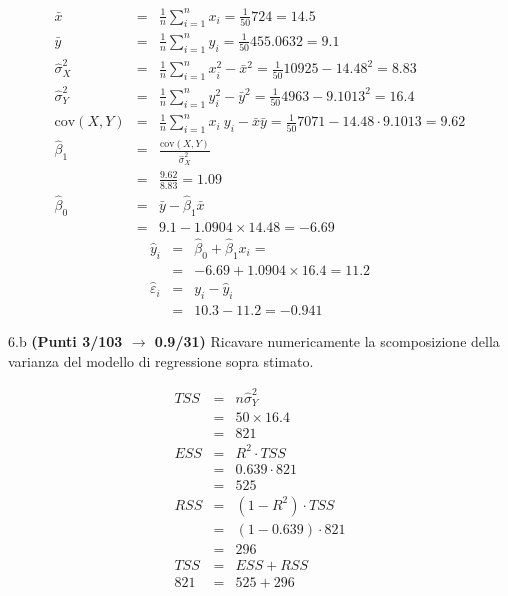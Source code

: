 \documentclass[
  11pt,
]{book}
\theoremstyle{mytheoremstyle}
\theoremstyle{mydefstyle}
\newenvironment{sol}
  {
  \begin{tcolorbox}[enhanced,breakable,arc=0.1mm,boxrule=1pt,colback=white,colframe=iblue,
  title=\bf \fontfamily{lmss}\selectfont \hspace{.5 cm} Soluzione,drop fuzzy shadow]

}{
\end{tcolorbox}
  }
\begin{document}
\begin{sol}
\begin{eqnarray*}
           \bar x &=&\frac 1 n\sum_{i=1}^n x_i = \frac {1}{ 50 }  724 =  14.5 \\
           \bar y &=&\frac 1 n\sum_{i=1}^n y_i = \frac {1}{ 50 }  455.0632 =  9.1 \\
           \hat\sigma_X^2&=&\frac 1 n\sum_{i=1}^n x_i^2-\bar x^2=\frac {1}{ 50 }  10925  - 14.48 ^2= 8.83 \\
           \hat\sigma_Y^2&=&\frac 1 n\sum_{i=1}^n y_i^2-\bar y^2=\frac {1}{ 50 }  4963  - 9.1013 ^2= 16.4 \\
           \text{cov}(X,Y)&=&\frac 1 n\sum_{i=1}^n x_i~y_i-\bar x\bar y=\frac {1}{ 50 }  7071 - 14.48 \cdot 9.1013 = 9.62 \\
           \hat\beta_1 &=& \frac{\text{cov}(X,Y)}{\hat\sigma_X^2} \\
                    &=& \frac{ 9.62 }{ 8.83 }  =  1.09 \\
           \hat\beta_0 &=& \bar y - \hat\beta_1 \bar x\\
                    &=&  9.1 - 1.0904 \times  14.48 = -6.69 
         \end{eqnarray*}\begin{eqnarray*}
\hat y_i &=&\hat\beta_0+\hat\beta_1 x_i=\\ 
&=& -6.69 + 1.0904 \times 16.4 = 11.2 \\ 
\hat \varepsilon_i &=& y_i-\hat y_i\\ 
&=& 10.3 - 11.2 = -0.941  
\end{eqnarray*}

\end{sol}

6.b \textbf{(Punti 3/103 \(\rightarrow\) 0.9/31)} Ricavare numericamente la scomposizione della varianza del modello di regressione sopra stimato.

\begin{sol}
\begin{eqnarray*}
   TSS &=& n\hat\sigma^2_Y\\
      &=& 50 \times 16.4 \\
      &=&  821 \\
   ESS &=& R^2\cdot TSS\\
      &=&  0.639 \cdot 821 \\
      &=& 525 \\
   RSS &=& (1-R^2)\cdot TSS\\
      &=& (1- 0.639 )\cdot 821 \\
      &=&  296 \\
   TSS &=& ESS+RSS \\ 821  &=&  525 + 296 
  \end{eqnarray*}

\end{sol}
\end{document}
